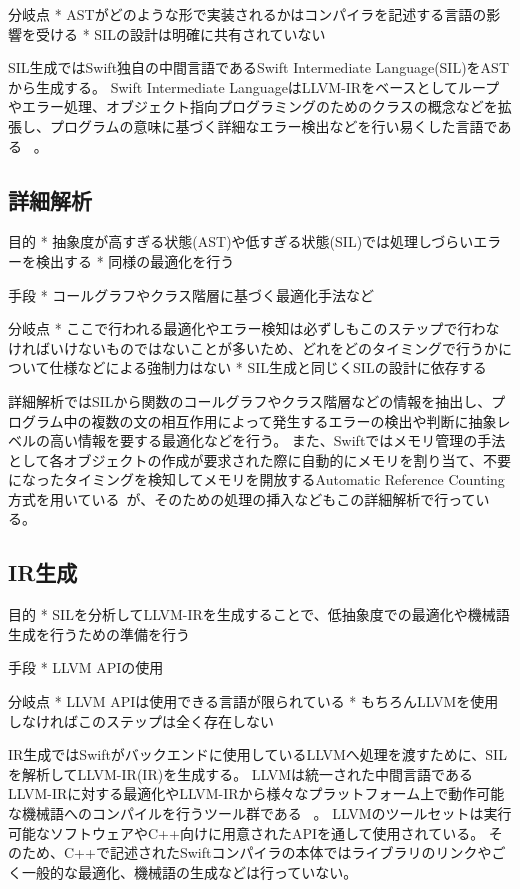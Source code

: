 分岐点
* ASTがどのような形で実装されるかはコンパイラを記述する言語の影響を受ける %
* SILの設計は明確に共有されていない %

SIL生成ではSwift独自の中間言語であるSwift Intermediate Language(SIL)をASTから生成する。
Swift Intermediate LanguageはLLVM-IRをベースとしてループやエラー処理、オブジェクト指向プログラミングのためのクラスの概念などを拡張し、プログラムの意味に基づく詳細なエラー検出などを行い易くした言語である ~\cite{sil}。

\subsection{詳細解析}

目的
* 抽象度が高すぎる状態(AST)や低すぎる状態(SIL)では処理しづらいエラーを検出する
* 同様の最適化を行う

手段
* コールグラフやクラス階層に基づく最適化手法など

分岐点
* ここで行われる最適化やエラー検知は必ずしもこのステップで行わなければいけないものではないことが多いため、どれをどのタイミングで行うかについて仕様などによる強制力はない
* SIL生成と同じくSILの設計に依存する

詳細解析ではSILから関数のコールグラフやクラス階層などの情報を抽出し、プログラム中の複数の文の相互作用によって発生するエラーの検出や判断に抽象レベルの高い情報を要する最適化などを行う。
また、Swiftではメモリ管理の手法として各オブジェクトの作成が要求された際に自動的にメモリを割り当て、不要になったタイミングを検知してメモリを開放するAutomatic Reference Counting方式を用いている~\cite{arc}が、そのための処理の挿入などもこの詳細解析で行っている。

\subsection{IR生成}

目的
* SILを分析してLLVM-IRを生成することで、低抽象度での最適化や機械語生成を行うための準備を行う

手段
* LLVM APIの使用

分岐点
* LLVM APIは使用できる言語が限られている
* もちろんLLVMを使用しなければこのステップは全く存在しない

IR生成ではSwiftがバックエンドに使用しているLLVMへ処理を渡すために、SILを解析してLLVM-IR(IR)を生成する。
LLVMは統一された中間言語であるLLVM-IRに対する最適化やLLVM-IRから様々なプラットフォーム上で動作可能な機械語へのコンパイルを行うツール群である ~\cite{llvm}。
LLVMのツールセットは実行可能なソフトウェアやC++向けに用意されたAPIを通して使用されている。
そのため、C++で記述されたSwiftコンパイラの本体ではライブラリのリンクやごく一般的な最適化、機械語の生成などは行っていない。

